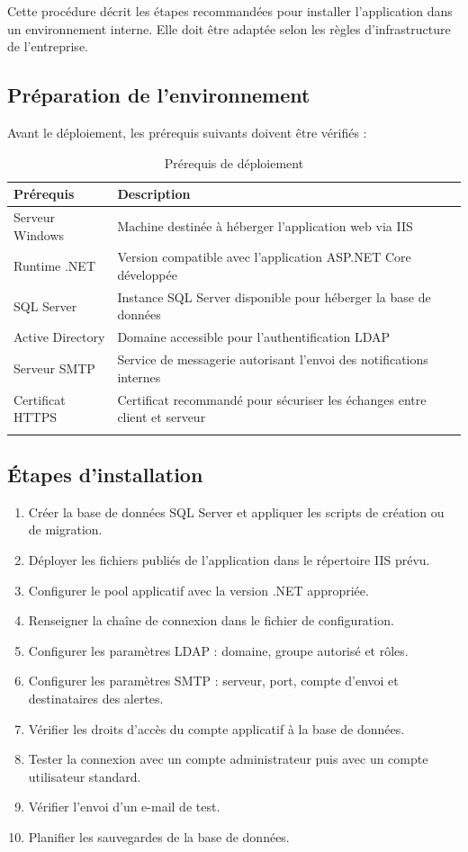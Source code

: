 Cette procédure décrit les étapes recommandées pour installer l'application dans un environnement interne. Elle doit être adaptée selon les règles d'infrastructure de l'entreprise.

\subsection*{Préparation de l'environnement}

Avant le déploiement, les prérequis suivants doivent être vérifiés :

\begin{longtable}{|m{4cm}|m{8cm}|}
\hline
\textbf{Prérequis} & \textbf{Description} \\
\hline
\endhead
\endfoot
\endlastfoot
\hline
Serveur Windows & Machine destinée à héberger l'application web via IIS \\
\hline
Runtime .NET & Version compatible avec l'application ASP.NET Core développée \\
\hline
SQL Server & Instance SQL Server disponible pour héberger la base de données \\
\hline
Active Directory & Domaine accessible pour l'authentification LDAP \\
\hline
Serveur SMTP & Service de messagerie autorisant l'envoi des notifications internes \\
\hline
Certificat HTTPS & Certificat recommandé pour sécuriser les échanges entre client et serveur \\
\hline
\captionsetup{justification=centering,margin=1cm}
\caption{Prérequis de déploiement}
\end{longtable}

\subsection*{Étapes d'installation}

\begin{enumerate}
    \item Créer la base de données SQL Server et appliquer les scripts de création ou de migration.
    \item Déployer les fichiers publiés de l'application dans le répertoire IIS prévu.
    \item Configurer le pool applicatif avec la version .NET appropriée.
    \item Renseigner la chaîne de connexion dans le fichier de configuration.
    \item Configurer les paramètres LDAP : domaine, groupe autorisé et rôles.
    \item Configurer les paramètres SMTP : serveur, port, compte d'envoi et destinataires des alertes.
    \item Vérifier les droits d'accès du compte applicatif à la base de données.
    \item Tester la connexion avec un compte administrateur puis avec un compte utilisateur standard.
    \item Vérifier l'envoi d'un e-mail de test.
    \item Planifier les sauvegardes de la base de données.
\end{enumerate}

